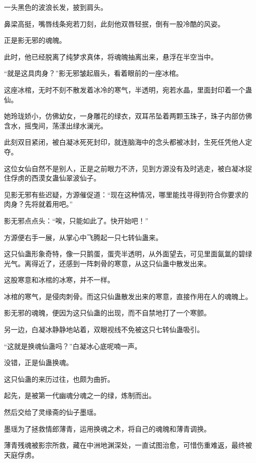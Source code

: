 
\begin{this_body}

一头黑色的波浪长发，披到肩头。

鼻梁高挺，嘴唇线条宛若刀刻，此刻他双唇轻抿，倒有一股冷酷的风姿。

正是影无邪的魂魄。

此时，他已经脱离了纯梦求真体，将魂魄抽离出来，悬浮在半空当中。

“就是这具肉身？”影无邪皱起眉头，看着眼前的一座冰棺。

这座冰棺，无时不刻不散发着冰冷的寒气，半透明，宛若水晶，里面封印着一个蛊仙。

她玲珑娇小，仿佛幼女，一身雕花的绿衣，双耳吊坠着两颗玉珠子，珠子内部仿佛含水，摇曳间，荡漾出绿水澜光。

此刻双目紧闭，被白凝冰死死封印，就连脑海中的念头都被冰封，生死任凭他人定夺。

这位女仙自然不是别人，正是之前眼力不济，见到方源没有及时逃走，被白凝冰捉住俘虏的西漠女蛊仙翠波仙子。

见影无邪有些迟疑，方源催促道：“现在这种情况，哪里能找寻得到符合你要求的肉身？先将就着用吧。”

影无邪点点头：“唉，只能如此了。快开始吧！”

方源便右手一展，从掌心中飞腾起一只七转仙蛊来。

这只仙蛊形象奇特，像一只鹅蛋，蛋壳半透明，从外面望去，可见里面氤氲的碧绿光气。离得近了，还感到一阵刺骨的寒意，从这只仙蛊中散发出来。

这股寒意和冰棺的冰寒，并不一样。

冰棺的寒气，是侵肉刺骨。而这只仙蛊散发出来的寒意，直接作用在人的魂魄上。

影无邪的魂魄，便因为这只仙蛊的出现，而不自禁地打了一个寒颤。

另一边，白凝冰静静地站着，双眼视线不免被这只七转仙蛊吸引。

“这就是换魂仙蛊吗？”白凝冰心底呢喃一声。

没错，正是仙蛊换魂。

这只仙蛊的来历过往，也颇为曲折。

起先，是被第一代幽魂分魂之一的绿，炼制而出。

然后交给了灵缘斋的仙子墨瑶。

墨瑶为了拯救情郎薄青，运用换魂之术，将自己的魂魄和薄青调换。

薄青残魂被影宗所救，藏在中洲地渊深处，一直试图治愈，可惜伤重难返，最终被天庭俘虏。


\end{this_body}
